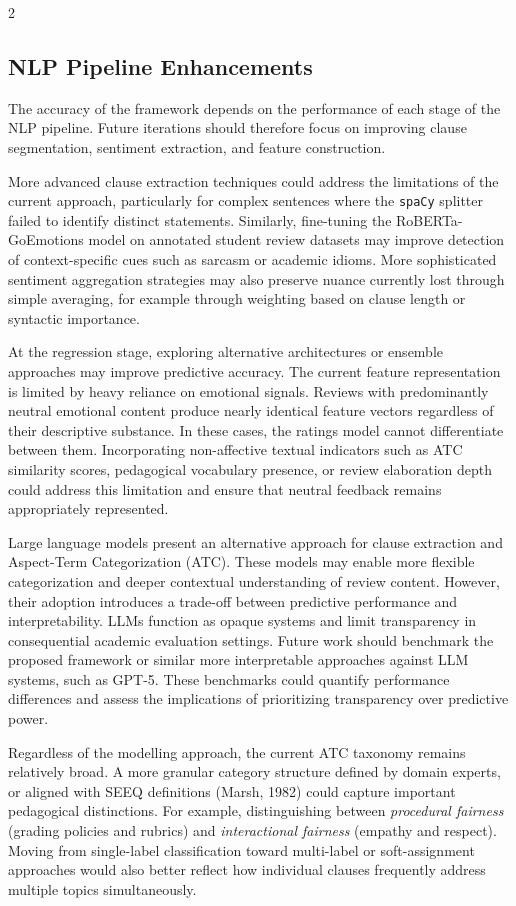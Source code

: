 \documentclass{article}
\begin{document}
\begin{multicols*}{2}
\subsection{NLP Pipeline Enhancements}
The accuracy of the framework depends on the performance of each stage of the NLP pipeline. Future iterations should therefore focus on improving clause segmentation, sentiment extraction, and feature construction.

More advanced clause extraction techniques could address the limitations of the current approach, particularly for complex sentences where the \texttt{spaCy} splitter failed to identify distinct statements. Similarly, fine-tuning the RoBERTa-GoEmotions model on annotated student review datasets may improve detection of context-specific cues such as sarcasm or academic idioms. More sophisticated sentiment aggregation strategies may also preserve nuance currently lost through simple averaging, for example through weighting based on clause length or syntactic importance.

At the regression stage, exploring alternative architectures or ensemble approaches may improve predictive accuracy. The current feature representation is limited by heavy reliance on emotional signals. Reviews with predominantly neutral emotional content produce nearly identical feature vectors regardless of their descriptive substance. In these cases, the ratings model cannot differentiate between them. Incorporating non-affective textual indicators such as ATC similarity scores, pedagogical vocabulary presence, or review elaboration depth could address this limitation and ensure that neutral feedback remains appropriately represented.

Large language models present an alternative approach for clause extraction and Aspect-Term Categorization (ATC). These models may enable more flexible categorization and deeper contextual understanding of review content. However, their adoption introduces a trade-off between predictive performance and interpretability. LLMs function as opaque systems and limit transparency in consequential academic evaluation settings. Future work should benchmark the proposed framework or similar more interpretable approaches against LLM systems, such as GPT-5. These benchmarks could quantify performance differences and assess the implications of prioritizing transparency over predictive power.

Regardless of the modelling approach, the current ATC taxonomy remains relatively broad. A more granular category structure defined by domain experts, or aligned with SEEQ definitions (Marsh, 1982) could capture important pedagogical distinctions. For example, distinguishing between \textit{procedural fairness} (grading policies and rubrics) and \textit{interactional fairness} (empathy and respect). Moving from single-label classification toward multi-label or soft-assignment approaches would also better reflect how individual clauses frequently address multiple topics simultaneously.


\end{multicols*}
\end{document}
